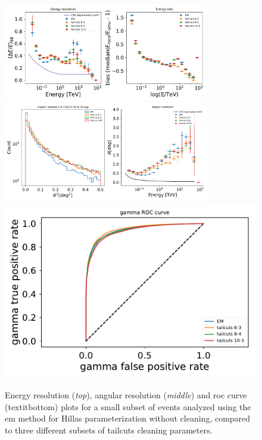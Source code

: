 \documentclass[main.tex]{subfiles}
\begin{document}
\begin{figure}[h!]
\centering
\includegraphics[width=0.8\textwidth]{Pictures/em_energy_resolution.pdf}
\includegraphics[width=0.8\textwidth]{Pictures/em_angular_resolution.pdf}
\includegraphics[width=1\textwidth]{Pictures/em_ROC.pdf}
\endminipage
  \caption{Energy resolution (\textit{top}), angular resolution (\textit{middle}) and \gls{roc} curve (textit{bottom}) plots for a small subset of events analyzed using the \gls{em} method for Hillas parameterization without cleaning, compared to three different subsets of tailcuts cleaning parameters. }
    \label{fig:em_res}
\end{figure}
\end{document}
